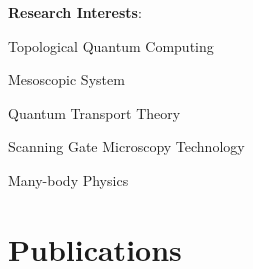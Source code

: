 \documentclass[letterpaper,10.8pt]{article}
\makeatletter
\newcommand{\resumeSubheading}[4]{
  \vspace{-1pt}\item
    \begin{tabular*}{0.97\textwidth}{l@{\extracolsep{\fill}}r}
      \textbf{#1} & #2 \\
      \textit{\small#3} & \textit{\small #4} \\
    \end{tabular*}\vspace{-5pt}
}
\newcommand{\resumeSubHeadingListStart}{\begin{itemize}[leftmargin=*]}
\makeatother
\begin{document}
\vspace{0.6em}
\textbf{Research Interests}:
\begin{description}[font=$\bullet$]
\item {Topological Quantum Computing}
\item {Mesoscopic System} 
\item {Quantum Transport Theory}
\item {Scanning Gate Microscopy Technology}
\item {Many-body Physics}
\end{description}

\section{Publications}
\end{document}
